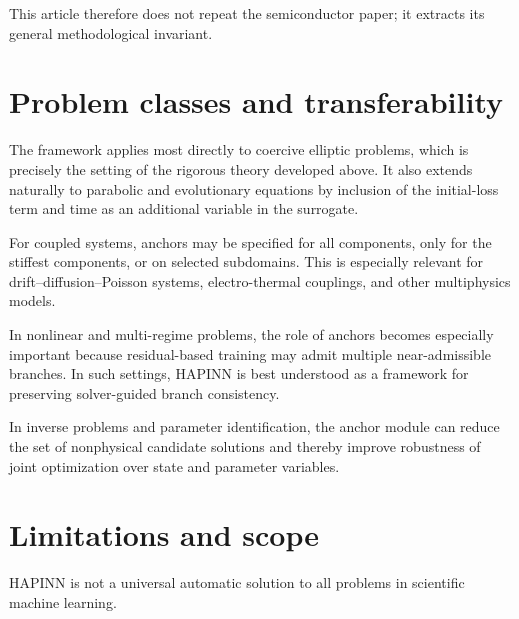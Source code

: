 \documentclass[preprint,12pt]{elsarticle}
\theoremstyle{definition}
\numberwithin{equation}{section}
\begin{document}
This article therefore does not repeat the semiconductor paper; it extracts its general methodological invariant.

\section{Problem classes and transferability}
\label{sec:classes}

The framework applies most directly to coercive elliptic problems, which is precisely the setting of the rigorous theory developed above. It also extends naturally to parabolic and evolutionary equations by inclusion of the initial-loss term and time as an additional variable in the surrogate.

For coupled systems, anchors may be specified for all components, only for the stiffest components, or on selected subdomains. This is especially relevant for drift--diffusion--Poisson systems, electro-thermal couplings, and other multiphysics models.

In nonlinear and multi-regime problems, the role of anchors becomes especially important because residual-based training may admit multiple near-admissible branches. In such settings, HAPINN is best understood as a framework for preserving solver-guided branch consistency.

In inverse problems and parameter identification, the anchor module can reduce the set of nonphysical candidate solutions and thereby improve robustness of joint optimization over state and parameter variables.

\section{Limitations and scope}
\label{sec:limitations}

HAPINN is not a universal automatic solution to all problems in scientific machine learning.
\end{document}
